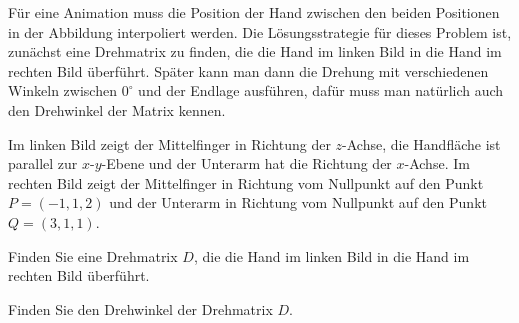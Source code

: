 Für eine Animation muss die Position der Hand zwischen den beiden
Positionen in der Abbildung interpoliert werden.
Die Lösungsstrategie für dieses Problem ist, zunächst eine Drehmatrix
zu finden, die die Hand im linken Bild in die Hand im rechten Bild überführt.
Später kann man dann die Drehung mit verschiedenen Winkeln zwischen $0^\circ$
und der Endlage ausführen, dafür muss man natürlich auch den Drehwinkel
der Matrix kennen.
\begin{center}
\end{center}
Im linken Bild zeigt der Mittelfinger in Richtung der $z$-Achse,
die Handfläche ist parallel zur $x$-$y$-Ebene und der Unterarm hat die
Richtung der $x$-Achse.
Im rechten Bild zeigt der Mittelfinger in Richtung vom Nullpunkt auf
den Punkt $P=(-1,1,2)$ und der Unterarm in Richtung vom Nullpunkt auf
den Punkt $Q=(3,1,1)$.

\begin{teilaufgaben}
\item
Finden Sie eine Drehmatrix $D$, die die Hand im linken Bild in die Hand im
rechten Bild überführt.
\item
Finden Sie den Drehwinkel der Drehmatrix $D$.
\end{teilaufgaben}


